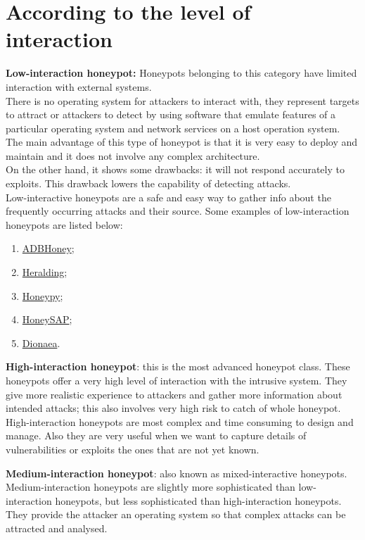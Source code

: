 \section{According to the level of interaction}
 \textbf{Low-interaction honeypot:} Honeypots belonging to this category have limited interaction with external systems.\\
 There is no operating system for attackers to interact with, they represent targets to attract or attackers to detect by using software that emulate features of a particular operating system and network services on a host operation system.\\
 The main advantage of this type of honeypot is that it is very easy to deploy and maintain and it does not involve any complex architecture. \\
 On the other hand, it shows some drawbacks: it will not respond accurately to exploits. This drawback lowers the capability of detecting attacks.\\
 Low-interactive honeypots are a safe and easy way to gather info about the frequently occurring attacks and their source.
Some examples of low-interaction honeypots are listed below:
\begin{enumerate}
    \item \href{https://github.com/huuck/ADBHoney}{ADBHoney};
    \item \href{https://github.com/johnnykv/heralding}{Heralding};
    \item \href{https://github.com/foospidy/HoneyPy}{Honeypy};
    \item \href{https://github.com/SecureAuthCorp/HoneySAP}{HoneySAP};
    \item \href{https://github.com/DinoTools/dionaea}{Dionaea}.
\end{enumerate}
\textbf{High-interaction honeypot}: this is the most advanced honeypot class.
These honeypots offer a very high level of interaction with the intrusive system. They give more realistic experience to attackers and gather more information about intended attacks; this also involves very high risk to catch of whole honeypot.\\
High-interaction honeypots are most complex and time consuming to design and manage. Also they are very useful when we want to capture details of vulnerabilities or exploits the ones that are not yet known.

\textbf{Medium-interaction honeypot}: also known as mixed-interactive honeypots. \\
Medium-interaction honeypots are slightly more sophisticated than low-interaction honeypots, but less sophisticated than high-interaction honeypots. They provide the attacker an operating system so that complex attacks can be attracted and analysed.

